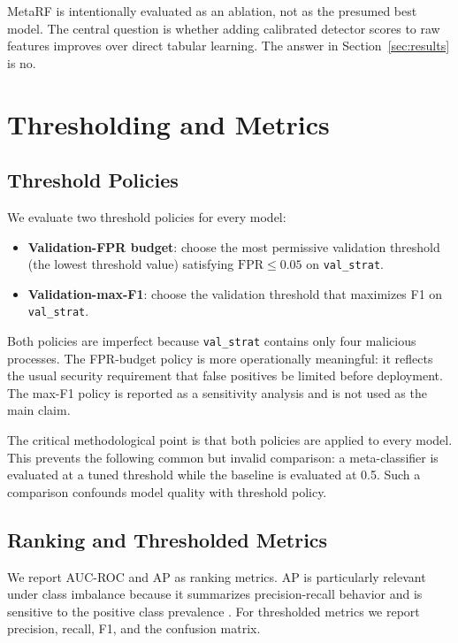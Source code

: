 \documentclass[10pt,journal,compsoc]{IEEEtran}
\begin{document}
MetaRF is intentionally evaluated as an ablation, not as the presumed best model. The central question is whether adding calibrated detector scores to raw features improves over direct tabular learning. The answer in Section~\ref{sec:results} is no.

\section{Thresholding and Metrics}
\label{sec:thresholds}

\subsection{Threshold Policies}

We evaluate two threshold policies for every model:
\begin{itemize}
    \item \textbf{Validation-FPR budget}: choose the most permissive validation threshold (the lowest threshold value) satisfying $\mathrm{FPR} \leq 0.05$ on \texttt{val\_strat}.
    \item \textbf{Validation-max-F1}: choose the validation threshold that maximizes F1 on \texttt{val\_strat}.
\end{itemize}
Both policies are imperfect because \texttt{val\_strat} contains only four malicious processes. The FPR-budget policy is more operationally meaningful: it reflects the usual security requirement that false positives be limited before deployment. The max-F1 policy is reported as a sensitivity analysis and is not used as the main claim.

The critical methodological point is that both policies are applied to every model. This prevents the following common but invalid comparison: a meta-classifier is evaluated at a tuned threshold while the baseline is evaluated at 0.5. Such a comparison confounds model quality with threshold policy.

\subsection{Ranking and Thresholded Metrics}

We report AUC-ROC and AP as ranking metrics. AP is particularly relevant under class imbalance because it summarizes precision-recall behavior and is sensitive to the positive class prevalence \cite{saito2015}. For thresholded metrics we report precision, recall, F1, and the confusion matrix.
\end{document}
